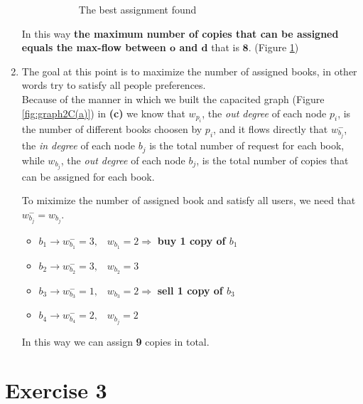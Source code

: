 \documentclass[
	12pt, %
]{fphw}
\begin{document}
\begin{enumerate}[{\bfseries (a)}]
\begin{figure}[H]
\begin{subfigure}{.5\textwidth}
            \caption{The best assignment found}
            \label{fig:graph2C(b)}
        \end{subfigure}
        \caption{}
        \label{fig:figEx2c}
    \end{figure}
    In this way \textbf{the maximum number of copies that can be assigned equals the max-flow between $\mathbf{o}$ and $\mathbf{d}$} that is $\mathbf{8}$. (Figure \ref{fig:graph2C(b)})
    
    \item The goal at this point is to maximize the number of assigned books, in other words try to satisfy all people preferences.\\ 
    Because of the manner in which we built the capacited graph (Figure \ref{fig:graph2C(a)}) in \textbf{(c)} we know that $w_{p_i}$, the \emph{out degree} of each node $p_i$, is the number of different books choosen by $p_i$, and it flows directly that $w^-_{b_j}$, the \emph{in degree} of each node $b_j$ is the total number of request for each book, while $w_{b_j}$, the \emph{out degree} of each node $b_j$, is the total number of copies that can be assigned for each book. 
    
    To miximize the number of assigned book and satisfy all users, we need that $w^-_{b_j} = w_{b_j}$.
    \begin{itemize}
        \item $b_1 \rightarrow w^-_{b_1} = 3, \hspace{10pt} w_{b_1} = 2 \Rightarrow $ \textbf{buy 1 copy of $b_1$}
        \item $b_2 \rightarrow w^-_{b_2} = 3, \hspace{10pt} w_{b_2} = 3$
        \item $b_3 \rightarrow w^-_{b_3} = 1, \hspace{10pt} w_{b_3} = 2 \Rightarrow$ \textbf{sell 1 copy of $b_3$}
        \item $b_4 \rightarrow w^-_{b_4} = 2, \hspace{10pt} w_{b_j} = 2$
    \end{itemize}
    In this way we can assign \textbf{9} copies in total. 
    
\end{enumerate}


\section*{Exercise 3}
\end{document}
